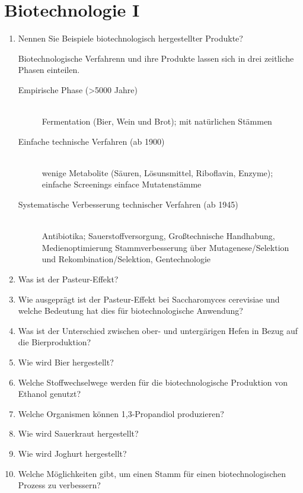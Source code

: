 
\section{Biotechnologie I}
\begin{enumerate}
	\item Nennen Sie Beispiele biotechnologisch hergestellter Produkte?
		
		 Biotechnologische Verfahrenn und ihre Produkte lassen sich in drei
		 zeitliche Phasen einteilen.
		 \begin{description}
		 	\item[Empirische Phase (>5000 Jahre)] \hfill \\
				Fermentation (Bier, Wein und Brot); mit natürlichen Stämmen
			\item[Einfache technische Verfahren (ab 1900)] \hfill \\
				wenige Metabolite (Säuren, Lösunsmittel, Riboflavin, Enzyme);
				einfache Screenings \texrightarrow einface Mutatenstämme
			\item[Systematische Verbesserung technischer Verfahren (ab 1945)] \hfill \\
				Antibiotika; Sauerstoffversorgung, Großtechnische Handhabung, Medienoptimierung
				Stammverbesserung über Mutagenese/Selektion und Rekombination/Selektion, Gentechnologie 
		\end{description}

	\item Was ist der Pasteur-Effekt?
	\item Wie ausgeprägt ist der Pasteur-Effekt bei Saccharomyces cerevisiae und welche Bedeutung hat dies für biotechnologische Anwendung?
	\item Was ist der Unterschied zwischen ober- und untergärigen Hefen in Bezug auf die Bierproduktion?
	\item Wie wird Bier hergestellt?
	\item Welche Stoffwechselwege werden für die biotechnologische Produktion von Ethanol genutzt?
	\item Welche Organismen können 1,3-Propandiol produzieren?
	\item Wie wird Sauerkraut hergestellt?
	\item Wie wird Joghurt hergestellt?
	\item Welche Möglichkeiten gibt, um einen Stamm für einen biotechnologischen Prozess zu verbessern?
\end{enumerate}
